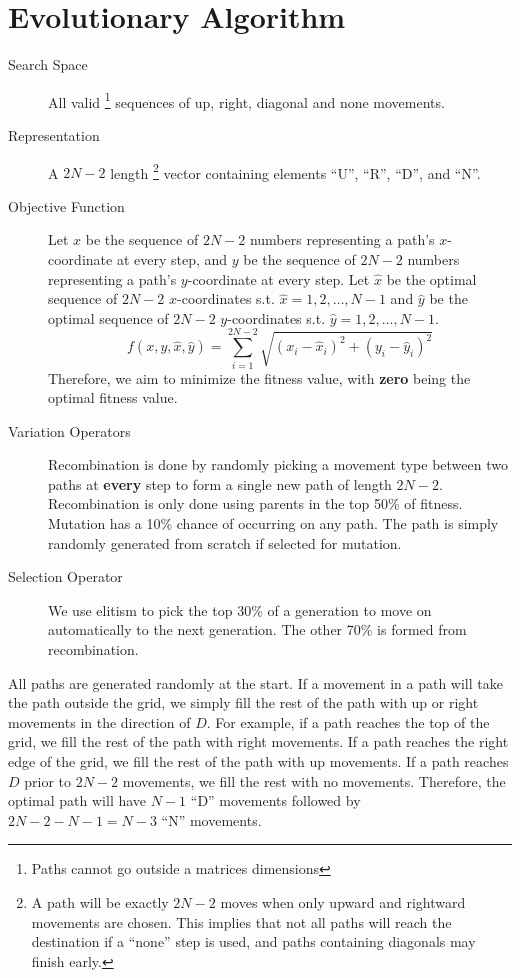 
\section{Evolutionary Algorithm}

\begin{description}
    \item[Search Space] All valid \footnote{Paths cannot go outside a matrices dimensions} sequences of up, right, diagonal and none movements.
    \item[Representation] A $2N - 2$ length \footnote{A path will be exactly $2N - 2$ moves when only upward and rightward movements are chosen. This implies that not all paths will reach the destination if a ``none'' step is used, and paths containing diagonals may finish early.} vector containing elements ``U'', ``R'', ``D'', and ``N''.
    \item[Objective Function] Let $x$ be the sequence of $2N - 2$ numbers representing a path's $x$-coordinate at every step, and $y$ be the sequence of $2N - 2$ numbers representing a path's $y$-coordinate at every step. Let $\hat{x}$ be the optimal sequence of $2N - 2$ $x$-coordinates s.t. $\hat{x} = 1,2,\dots,N-1$ and $\hat{y}$ be the optimal sequence of $2N - 2$ $y$-coordinates s.t. $\hat{y} = 1,2,\dots,N-1$.
    \begin{equation*}
        f(x, y, \hat{x}, \hat{y}) = \sum_{i=1}^{2N-2} \sqrt{(x_{i} - \hat{x}_{i})^2 + (y_i - \hat{y}_{i})^2}
    \end{equation*}
    Therefore, we aim to minimize the fitness value, with \textbf{zero} being the optimal fitness value.
    \item[Variation Operators] Recombination is done by randomly picking a movement type between two paths at \textbf{every} step to form a single new path of length $2N-2$. Recombination is only done using parents in the top 50\% of fitness. Mutation has a 10\% chance of occurring on any path. The path is simply randomly generated from scratch if selected for mutation.
    \item[Selection Operator] We use elitism to pick the top 30\% of a generation to move on automatically to the next generation. The other 70\% is formed from recombination.
\end{description}

All paths are generated randomly at the start. If a movement in a path will take the path outside the grid, we simply fill the rest of the path with up or right movements in the direction of $D$. For example, if a path reaches the top of the grid, we fill the rest of the path with right movements. If a path reaches the right edge of the grid, we fill the rest of the path with up movements. If a path reaches $D$ prior to $2N-2$ movements, we fill the rest with no movements. Therefore, the optimal path will have $N-1$ ``D'' movements followed by $2N-2-N-1=N-3$ ``N'' movements.
